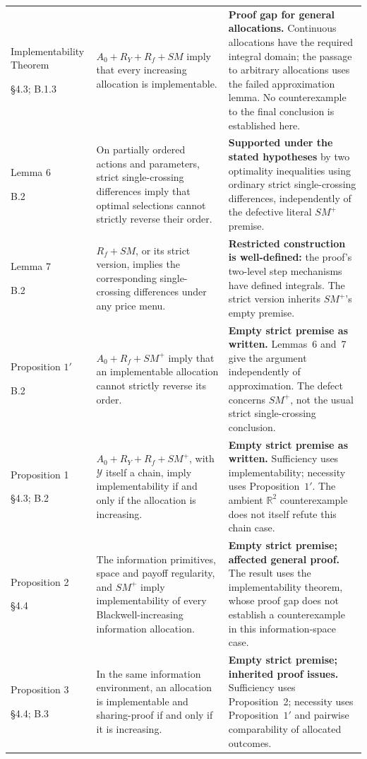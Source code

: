 \documentclass[11pt]{article}
\theoremstyle{remark}\newtheorem{remark}[theorem]{Remark}
\begin{document}
\begin{longtable}{@{}>{\raggedright\arraybackslash}p{2.60cm}>{\raggedright\arraybackslash}p{6.30cm}>{\raggedright\arraybackslash}p{6.45cm}@{}}
Implementability Theorem\par \S4.3; B.1.3
& $A_0+R_Y+R_f+SM$ imply that every increasing allocation is implementable.
& \textbf{Proof gap for general allocations.} Continuous allocations have the required integral domain; the passage to arbitrary allocations uses the failed approximation lemma. No counterexample to the final conclusion is established here. \\
Lemma 6\par B.2
& On partially ordered actions and parameters, strict single-crossing differences imply that optimal selections cannot strictly reverse their order.
& \textbf{Supported under the stated hypotheses} by two optimality inequalities using ordinary strict single-crossing differences, independently of the defective literal $SM^+$ premise. \\
Lemma 7\par B.2
& $R_f+SM$, or its strict version, implies the corresponding single-crossing differences under any price menu.
& \textbf{Restricted construction is well-defined:} the proof's two-level step mechanisms have defined integrals. The strict version inherits $SM^+$'s empty premise. \\
Proposition $1'$\par B.2
& $A_0+R_f+SM^+$ imply that an implementable allocation cannot strictly reverse its order.
& \textbf{Empty strict premise as written.} Lemmas~6 and~7 give the argument independently of approximation. The defect concerns $SM^+$, not the usual strict single-crossing conclusion. \\
Proposition 1\par \S4.3; B.2
& $A_0+R_Y+R_f+SM^+$, with $\mathcal Y$ itself a chain, imply implementability if and only if the allocation is increasing.
& \textbf{Empty strict premise as written.} Sufficiency uses implementability; necessity uses Proposition~$1'$. The ambient $\mathbb R^2$ counterexample does not itself refute this chain case. \\
Proposition 2\par \S4.4
& The information primitives, space and payoff regularity, and $SM^+$ imply implementability of every Blackwell-increasing information allocation.
& \textbf{Empty strict premise; affected general proof.} The result uses the implementability theorem, whose proof gap does not establish a counterexample in this information-space case. \\
Proposition 3\par \S4.4; B.3
& In the same information environment, an allocation is implementable and sharing-proof if and only if it is increasing.
& \textbf{Empty strict premise; inherited proof issues.} Sufficiency uses Proposition~2; necessity uses Proposition~$1'$ and pairwise comparability of allocated outcomes. \\
\end{longtable}
\endgroup
\FloatBarrier
\end{document}

